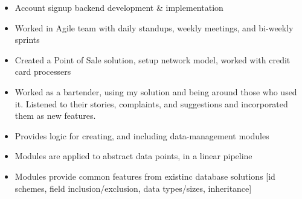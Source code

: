 \documentclass[10pt,a4paper]{altacv}
\begin{document}


\begin{fullwidth}
\makecvheader
\end{fullwidth}


\begin{itemize}
    \item Account signup backend development & implementation
    \item Worked in Agile team with daily standups, weekly meetings, and bi-weekly sprints
\end{itemize}


\divider

\begin{itemize}
    \item Created a Point of Sale solution, setup network model, worked with credit card processers
    \item Worked as a bartender, using my solution and being around those who used it. Listened to their stories, complaints, and suggestions and incorporated them as new features.
\end{itemize}




\begin{itemize}
    \item Provides logic for creating, and including data-management modules
    \item Modules are applied to abstract data points, in a linear pipeline
    \item Modules provide common features from existinc database solutions [id schemes, field inclusion/exclusion, data types/sizes, inheritance]
\end{itemize}
\end{document}
